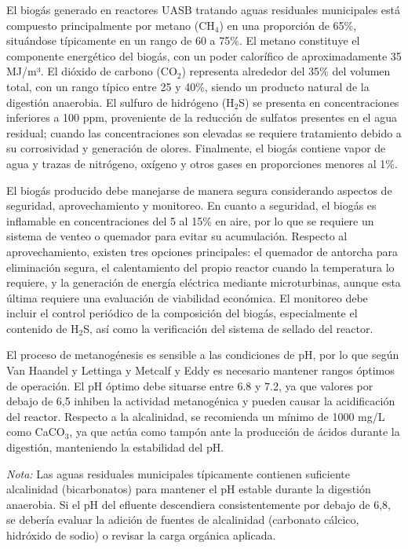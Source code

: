 \documentclass[12pt,a4paper]{article}
\begin{document}
El biogás generado en reactores UASB tratando aguas residuales municipales está compuesto principalmente por metano (CH$_4$) en una proporción de 65\%, situándose típicamente en un rango de 60 a 75\%. El metano constituye el componente energético del biogás, con un poder calorífico de aproximadamente 35 MJ/m³. El dióxido de carbono (CO$_2$) representa alrededor del 35\% del volumen total, con un rango típico entre 25 y 40\%, siendo un producto natural de la digestión anaerobia. El sulfuro de hidrógeno (H$_2$S) se presenta en concentraciones inferiores a 100 ppm, proveniente de la reducción de sulfatos presentes en el agua residual; cuando las concentraciones son elevadas se requiere tratamiento debido a su corrosividad y generación de olores. Finalmente, el biogás contiene vapor de agua y trazas de nitrógeno, oxígeno y otros gases en proporciones menores al 1\%.

El biogás producido debe manejarse de manera segura considerando aspectos de seguridad, aprovechamiento y monitoreo. En cuanto a seguridad, el biogás es inflamable en concentraciones del 5 al 15\% en aire, por lo que se requiere un sistema de venteo o quemador para evitar su acumulación. Respecto al aprovechamiento, existen tres opciones principales: el quemador de antorcha para eliminación segura, el calentamiento del propio reactor cuando la temperatura lo requiere, y la generación de energía eléctrica mediante microturbinas, aunque esta última requiere una evaluación de viabilidad económica. El monitoreo debe incluir el control periódico de la composición del biogás, especialmente el contenido de H$_2$S, así como la verificación del sistema de sellado del reactor.

El proceso de metanogénesis es sensible a las condiciones de pH, por lo que según Van Haandel y Lettinga \cite{vanhaandel1994} y Metcalf y Eddy \cite{metcalf2014} es necesario mantener rangos óptimos de operación. El pH óptimo debe situarse entre 6.8 y 7.2, ya que valores por debajo de 6,5 inhiben la actividad metanogénica y pueden causar la acidificación del reactor. Respecto a la alcalinidad, se recomienda un mínimo de 1000 mg/L como CaCO$_3$, ya que actúa como tampón ante la producción de ácidos durante la digestión, manteniendo la estabilidad del pH.

\textit{Nota:} Las aguas residuales municipales típicamente contienen suficiente alcalinidad (bicarbonatos) para mantener el pH estable durante la digestión anaerobia. Si el pH del efluente descendiera consistentemente por debajo de 6,8, se debería evaluar la adición de fuentes de alcalinidad (carbonato cálcico, hidróxido de sodio) o revisar la carga orgánica aplicada.
\end{document}
